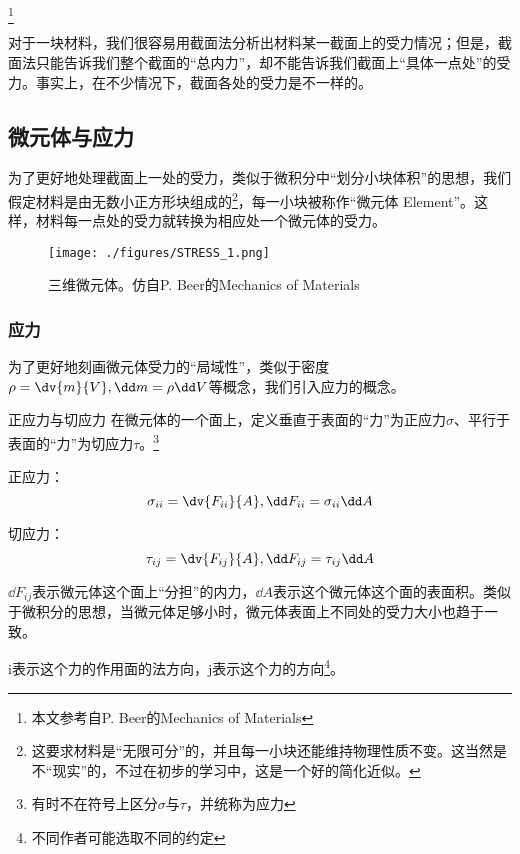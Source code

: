 
\begin{issues}
\issueTODO
\end{issues}

\footnote{本文参考自P. Beer的Mechanics of Materials}

对于一块材料，我们很容易用截面法分析出材料某一截面上的受力情况；但是，截面法只能告诉我们整个截面的“总内力”，却不能告诉我们截面上“具体一点处”的受力。事实上，在不少情况下，截面各处的受力是不一样的。

\subsection{微元体与应力}
为了更好地处理截面上一处的受力，类似于微积分中“划分小块体积”的思想，我们假定材料是由无数小正方形块组成的\footnote{这要求材料是“无限可分”的，并且每一小块还能维持物理性质不变。这当然是不“现实”的，不过在初步的学习中，这是一个好的简化近似。}，每一小块被称作“微元体 Element”。这样，材料每一点处的受力就转换为相应处一个微元体的受力。

\begin{figure}[ht]
\centering
\texttt{[image: ./figures/STRESS\_1.png]}
\caption{三维微元体。仿自P. Beer的Mechanics of Materials} \label{STRESS_fig1}
\end{figure}

\subsubsection{应力}

为了更好地刻画微元体受力的“局域性”，类似于密度$\rho=\dv{m}{V}, \dd m = \rho \dd V$等概念，我们引入应力的概念。

\begin{definition}{正应力与切应力}
在微元体的一个面上，定义垂直于表面的“力”为正应力$\sigma$、平行于表面的“力”为切应力$\tau$。\footnote{有时不在符号上区分$\sigma$与$\tau$，并统称为应力}

正应力：$$\sigma_{ii} =\dv{F_{ii}}{A}, \dd F_{ii} = \sigma_{ii} \dd A$$

切应力：$$\tau_{ij}=\dv{F_{ij}}{A}, \dd F_{ij} = \tau_{ij} \dd A$$

$\dd F_{ij}$表示微元体这个面上“分担”的内力，$\dd A$表示这个微元体这个面的表面积。类似于微积分的思想，当微元体足够小时，微元体表面上不同处的受力大小也趋于一致。

i表示这个力的作用面的法方向，j表示这个力的方向\footnote{不同作者可能选取不同的约定}。
\end{definition}

